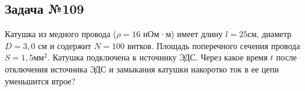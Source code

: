 \subsection{Задача №109}

Катушка из медного провода ($\rho = 16$ нОм·м) имеет длину $l = 25 $см, диаметр $D = 3,0$ см и содержит $N= 100$ витков. Площадь поперечного сечения провода $S = 1,5 \text{мм}^2$. Катушка подключена к источнику ЭДС. Через какое время $t$ после отключения источника ЭДС и замыкания катушки накоротко ток в ее цепи уменьшится втрое?